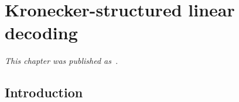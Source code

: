 \chapter{Kronecker-structured linear decoding}
\label{sec:stbf-struct}
\newcommand{\pv}[1]{
	#1
}

  \emph{This chapter was
  published as~\textcite{VanDenKerchove2022}}.

	\section{Introduction}



